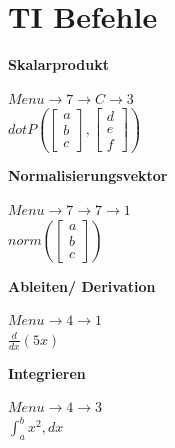 \section{TI Befehle}
\begin{minipage}{0.5\linewidth}
\textbf{Skalarprodukt}
\begin{center}
    $Menu \rightarrow 7 \rightarrow C \rightarrow 3$\\
    $dotP\left(\begin{bmatrix}a \\ b\\ c\end{bmatrix}, \begin{bmatrix}d \\ e \\ f\end{bmatrix}\right)$
\end{center}
\end{minipage}
\begin{minipage}{0.49\linewidth}
\textbf{Normalisierungsvektor}
\begin{center}
    $Menu \rightarrow 7 \rightarrow 7 \rightarrow 1$\\
    $norm\left(\begin{bmatrix}a \\ b\\ c\end{bmatrix}\right)$
\end{center}
\end{minipage}

\begin{minipage}{0.5\linewidth}
\textbf{Ableiten/ Derivation}
\begin{center}
    $Menu \rightarrow 4 \rightarrow 1$\\
    $\frac{d}{dx}(5x)$
\end{center}
\end{minipage}
\begin{minipage}{0.49\linewidth}
\textbf{Integrieren}
\begin{center}
    $Menu \rightarrow 4 \rightarrow 3$\\
    $\int_{a}^{b} x^2,dx$
\end{center}
\end{minipage}

